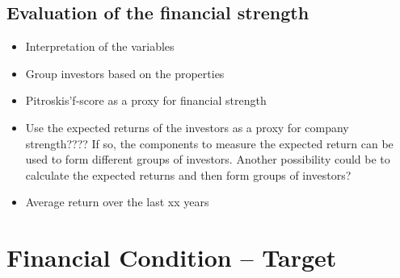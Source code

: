 \documentclass[12pt]{article}
\begin{document}
\subsection{Evaluation of the financial strength} 
    
    \begin{itemize}

        \item Interpretation of the variables
        \item Group investors based on the properties
        \item Pitroskis'f-score as a proxy for financial strength
        \item Use the expected returns of the investors as a proxy for company strength???? If so, the components to measure the expected return can be used to form different groups of investors. Another possibility could be to calculate the expected returns and then form groups of investors? 
        \item Average return over the last xx years 

    \end{itemize}

\section{Financial Condition -- Target}
\end{document}
